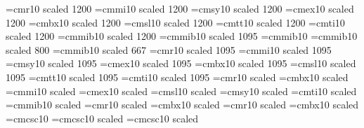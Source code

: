 %
%
  \font\twelverm=cmr10 scaled 1200       \font\twelvei=cmmi10 scaled 1200
  \font\twelvesy=cmsy10 scaled 1200      \font\twelveex=cmex10 scaled 1200
  \font\twelvebf=cmbx10 scaled 1200      \font\twelvesl=cmsl10 scaled 1200
  \font\twelvett=cmtt10 scaled 1200      \font\twelveit=cmti10 scaled 1200
  \font\twelvemib=cmmib10 scaled 1200
  \font\elevenmib=cmmib10 scaled 1095
  \font\tenmib=cmmib10
  \font\eightmib=cmmib10 scaled 800
  \font\sixmib=cmmib10 scaled 667
\font\elevenrm=cmr10 scaled 1095    \font\eleveni=cmmi10 scaled 1095
\font\elevensy=cmsy10 scaled 1095   \font\elevenex=cmex10 scaled 1095
\font\elevenbf=cmbx10 scaled 1095   \font\elevensl=cmsl10 scaled 1095
\font\eleventt=cmtt10 scaled 1095   \font\elevenit=cmti10 scaled 1095
%
%
\font\seventeenrm=cmr10 scaled 
\font\seventeenbf=cmbx10 scaled 
\font\seventeeni=cmmi10 scaled 
\font\seventeenex=cmex10 scaled 
\font\seventeensl=cmsl10 scaled 
\font\seventeensy=cmsy10 scaled 
\font\seventeenit=cmti10 scaled 
\font\seventeenmib=cmmib10 scaled 
\font\fourteenrm=cmr10 scaled
\font\fourteenbf=cmbx10 scaled 
\font\hugestrm=cmr10 scaled 
\font\hugestbf=cmbx10 scaled 
\font\tencp=cmcsc10
\font\twelvecp=cmcsc10 scaled 
\font\seventeencp=cmcsc10 scaled 
\newfam\cpfam%


